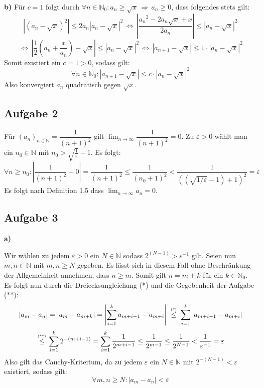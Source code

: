 \documentclass[a4paper,graphics,11pt]{article}
\newcommand{\aufgabe}[1]{\subsection*{Aufgabe #1}}
\newcommand{\up}[2]{\mathrel{\overset{\makebox[0pt]{\mbox{\normalfont\tiny #2}}}{#1}}}
\begin{document}
\textbf{b)} Für $c = 1$ folgt durch $\forall n \in \mathbb{N}_0 \colon a_n \geq \sqrt{x} \,\Longrightarrow\, a_n \geq 0$, dass folgendes stets gilt:
$$
    |(a_n - \sqrt{x})^2| \leq 2a_n|a_n - \sqrt{x}|^2 \,\Longleftrightarrow\,
    \left|\frac{{a_n}^2-2a_n\sqrt{x}+x}{2a_n}\right| \leq |a_n - \sqrt{x}|^2
$$$$
    \,\Longleftrightarrow\,\left|\frac{1}{2}\left(a_n+\frac{x}{a_n}\right) -\sqrt{x}\right|
    \leq |a_n-\sqrt{x}|^2
    \,\Longleftrightarrow\, |a_{n+1} -\sqrt{x}| \leq 1\cdot |a_n-\sqrt{x}|^2
$$
Somit existiert ein $c = 1 > 0$, sodass gilt:
$$
    \forall n \in \mathbb{N}_0 \colon |a_{n+1}-\sqrt{x}| \leq c\cdot |a_n-\sqrt{x}|^2
$$
Also konvergiert $a_n$ quadratisch gegen $\sqrt{x}$.
\newpage
\aufgabe{2}
Für $(a_n)_{n \in \mathbb{N}} = \dfrac{1}{(n+1)^2}$ gilt $\lim_{n \to \infty}\limits
\dfrac{1}{(n+1)^2} = 0$. Zu $\varepsilon > 0$ wählt man ein $n_0 \in \mathbb{N}$ mit
$\displaystyle n_0 > \sqrt{\frac{1}{\varepsilon}}-1$.
Es folgt:
$$
    \forall n \geq n_0 \colon \left|\frac{1}{(n+1)^2}-0\right| = \frac{1}{(n+1)^2}
    \leq \frac{1}{(n_0+1)^2} <
    \frac{1}{\left(\left(\sqrt{1/\varepsilon}-1\right)+1\right)^2} = \varepsilon
$$
Es folgt nach Definition 1.5 dass $\lim_{n \to \infty}\limits a_n = 0$.

\aufgabe{3}

\textbf{a)}

Wir wählen zu jedem $\varepsilon > 0$ ein $N \in \mathbb{N}$ sodass
$2^{(N-1)} > \varepsilon^{-1}$ gilt.
Seien nun $m,n \in \mathbb{N}$ mit $m, n\geq N$ gegeben. Es lässt sich in diesem Fall
ohne Beschränkung der Allgemeinheit annehmen, dass $n \geq m$. Somit gilt $n = m+k$ für
ein $k \in \mathbb{N}_0$. Es folgt nun durch die Dreiecksungleichung (*) und die Gegebenheit
der Aufgabe (**):
$$
    |a_m - a_n| = |a_m - a_{m+k}| = \left|\sum_{i=1}^{k} a_{m+i-1} - a_{m+i}\right|
    \up{\ \leq\ }{(*)} \sum_{i=1}^{k} |a_{m+i-1} - a_{m+i}|
$$$$
    \up{\ \leq\ }{(**)} \sum_{i=1}^{k} 2^{-(m+i-1)}
    = \sum_{i=1}^{k} \frac{1}{2^{m+i-1}} \leq \frac{1}{2^{m-1}}
    \leq \frac{1}{2^{N-1}} < \frac{1}{\varepsilon^{-1}} = \varepsilon
$$
Also gilt das Cauchy-Kriterium, da zu jedem $\varepsilon$ ein $N\in \mathbb{N}$ mit
$2^{-(N-1)} < \varepsilon$ existiert, sodass gilt:
$$
    \forall m,n \geq N \colon |a_m-a_n| < \varepsilon
$$
\end{document}
